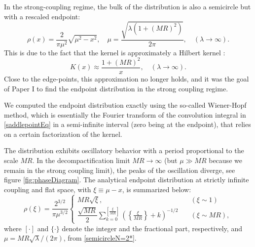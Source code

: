 In the strong-coupling regime, the bulk of the distribution is also a semicircle but with a rescaled endpoint:
\begin{equation}\label{semicircleN=2*}
 \rho(x) = \dfrac{2}{\pi \mu^2} \sqrt{\mu^2-x^2}, 
 \quad
 \mu=\dfrac{\sqrt{\lambda (1+(MR)^2)}}{2\pi},
 \quad (\lambda \rightarrow \infty).
\end{equation}
This is due to the fact that the kernel is approximately a Hilbert kernel \cite{Buchel:2013id}:
\begin{equation} \label{Kapprox}
 K(x) \approx \dfrac{1+(MR)^2}{x}, \quad (\lambda \rightarrow \infty).
\end{equation}
Close to the edge-points, this approximation no longer holds,
and it was the goal of Paper I to find the endpoint distribution in the strong coupling regime.

We computed the endpoint distribution exactly using the so-called Wiener-Hopf method, 
which is essentially the Fourier transform of the convolution integral in \eqref{saddlepointEq} in a semi-infinite interval 
(zero being at the endpoint),
that relies on a certain factorization of the kernel.

The distribution exhibits oscillatory behavior with a period proportional to the scale $M R$. 
In the decompactification limit $MR\rightarrow \infty$ (but $\mu\gg MR$ because we remain in the strong coupling limit), 
the peaks of the oscillation diverge, see figure \ref{fig:phaseDiagram}.
The analytical endpoint distribution at strictly infinite coupling and flat space, with $\xi\equiv\mu-x$, is summarized below:
\begin{equation}
 \rho(\xi )= \frac{2^{3/2}}{\pi \mu^{3/2}}
 \begin{cases}
   MR \sqrt{\xi}, 
   &\quad (\xi \sim 1)\\
   \dfrac{\sqrt{M R}}{2}\sum_{k=0}^{\left[\frac{\xi }{MR}\right]}
             \left(\left\{\frac{\xi }{MR}\right\} + k\right)^{-1/2}
   &\quad (\xi \sim M R),
 \end{cases}
\end{equation}
where $[\cdot]$ and $\{\cdot\}$ denote the integer and the fractional part, respectively, 
and $\mu=MR\sqrt{\lambda}/(2\pi)$, from \eqref{semicircleN=2*}.

